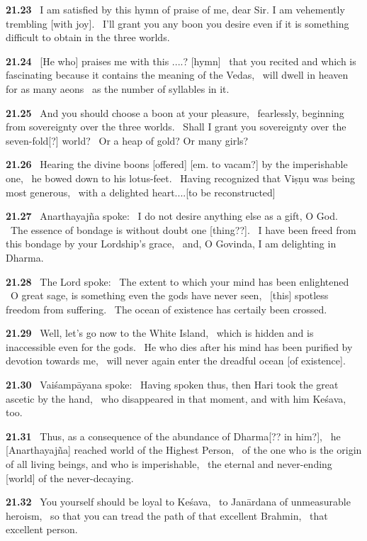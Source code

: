 \documentclass{article}
\begin{document}
\textbf{21.23}%
\ I am satisfied by this hymn of praise of me, dear Sir. I am vehemently trembling [with joy].%
\ I'll grant you any boon you desire even if it is something difficult to obtain in the three worlds.%


\textbf{21.24}%
\ [He who] praises me with this ....?  [hymn]%
\ that you recited and which is fascinating because it contains the meaning of the Vedas,%
\ will dwell in heaven for as many aeons%
\ as the number of syllables in it.%


\textbf{21.25}%
\ And you should choose a boon at your pleasure,%
\ fearlessly, beginning from sovereignty over the three worlds.%
\ Shall I grant you sovereignty over the seven-fold[?] world?%
\ Or a heap of gold? Or many girls?%


\textbf{21.26}%
\ Hearing the divine boons [offered] [em. to vacam?] by the imperishable one,%
\ he bowed down to his lotus-feet.%
\ Having recognized that Viṣṇu was being most generous,%
\ with a delighted heart....[to be reconstructed]%


\textbf{21.27}%
\ Anarthayajña spoke:%
\ I do not desire anything else as a gift, O God.%
\ The essence of bondage is without doubt one [thing??].%
\ I have been freed from this bondage by your Lordship's grace,%
\ and, O Govinda, I am delighting in Dharma.%


\textbf{21.28}%
\ The Lord spoke:%
\ The extent to which your mind has been enlightened%
\ O great sage, is something even the gods have never seen,%
\ [this] spotless freedom from suffering.%
\ The ocean of existence has certaily been crossed.%


\textbf{21.29}%
\ Well, let's go now to the White Island,%
\ which is hidden and is inaccessible even for the gods.%
\ He who dies after his mind has been purified by devotion towards me,%
\ will never again enter the dreadful ocean [of existence].%


\textbf{21.30}%
\ Vaiśampāyana spoke:%
\ Having spoken thus, then Hari took the great ascetic by the hand,%
\ who disappeared in that moment, and with him Keśava, too.%


\textbf{21.31}%
\ Thus, as a consequence of the abundance of Dharma[?? in him?],%
\ he [Anarthayajña] reached world of the Highest Person,%
\ of the one who is the origin of all living beings, and who is imperishable,%
\ the eternal and never-ending [world] of the never-decaying.%


\textbf{21.32}%
\ You yourself should be loyal to Keśava,%
\ to Janārdana of unmeasurable heroism,%
\ so that you can tread the path of that excellent Brahmin,%
\ that excellent person.%
\end{document}
